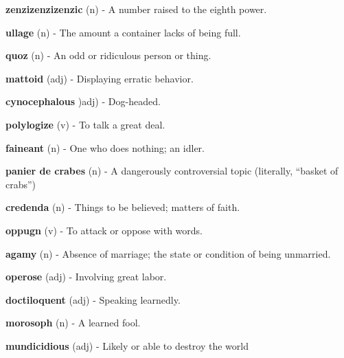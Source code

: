 \documentclass[landscape,a0paper,fontscale=0.28]{baposter} %
\begin{document}
\begin{poster}
{	\textbf{zenzizenzizenzic} (n) - A number raised to the eighth power.
	
	\textbf{ullage}
	(n) - The amount a container lacks of being full.
	
	\textbf{quoz}
	(n) - An odd or ridiculous person or thing.
	
	\textbf{mattoid}
	(adj) - Displaying erratic behavior.
	
	\textbf{cynocephalous}
	)adj) - Dog-headed.
	
	\textbf{polylogize}
	(v) - To talk a great deal.
	
	\textbf{faineant}
	(n) - One who does nothing; an idler.
	
	\textbf{panier de crabes}
	(n) - A dangerously controversial topic (literally, ``basket of crabs'')
	
	\textbf{credenda}
	(n) - Things to be believed; matters of faith.
	
	\textbf{oppugn}
	(v) - To attack or oppose with words.
	
	\textbf{agamy}
	(n) - Absence of marriage; the state or condition of being unmarried.
	
	\textbf{operose}
	(adj) - Involving great labor.
	
	\textbf{doctiloquent}
	(adj) - Speaking learnedly.
	
	\textbf{morosoph}
	(n) - A learned fool.
	
	\textbf{mundicidious}
	(adj) - Likely or able to destroy the world
}


\end{poster}
\end{document}
